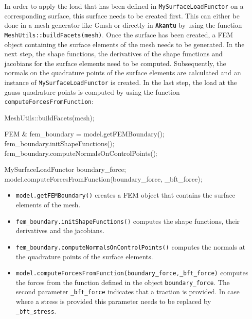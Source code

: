 \documentclass[a4paper,11pt]{book}
\newcommand{\akantu}{{\texttt{\textbf{Akantu}}}\xspace}
\newcommand{\code}[1]{\texttt{#1}}
\begin{document}
In order to apply the load that has been defined in \code{MySurfaceLoadFunctor} on a corresponding surface, this surface needs to be created first. This can either be done in a mesh generator like Gmsh or directly in \akantu by using the function \code{MeshUtils::buildFacets(mesh)}. Once the surface has been created, a FEM object containing the surface elements of the mesh needs to be generated. In the next step, the shape functions, the derivatives of the shape functions and jacobians for the surface elements need to be computed. Subsequently, the normals on the quadrature points of the surface elements are calculated and an instance of \code{MySurfaceLoadFunctor} is created. In the last step, the load at the gauss quadrature points is computed by using the function \code{computeForcesFromFunction}:
\begin{cpp}
  MeshUtils::buildFacets(mesh);

  FEM & fem_boundary = model.getFEMBoundary();
  fem_boundary.initShapeFunctions();
  fem_boundary.computeNormalsOnControlPoints();

  MySurfaceLoadFunctor boundary_force;  
  model.computeForcesFromFunction(boundary_force, _bft_force);
\end{cpp} 
\begin{itemize}
\item\code{model.getFEMBoundary()} creates a FEM object that contains the surface elements of the mesh.
\item\code{fem\_boundary.initShapeFunctions()} computes the shape functions, their derivatives and the jacobians.
\item\code{fem\_boundary.computeNormalsOnControlPoints()} computes the normals at the quadrature points of the surface elements.
\item\code{model.computeForcesFromFunction(boundary\_force,\_bft\_force)} computes the forces from the function defined in the object \code{boundary\_force}. The second parameter \code{\_bft\_force} indicates that a traction is provided. In case where a stress is provided this parameter needs to be replaced by \code{\_bft\_stress}.
\end{itemize}
  
\end{document}
